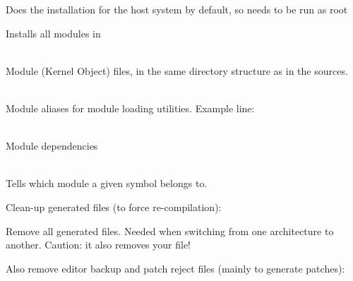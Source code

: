   \startitemize
  \item {}
    \startitemize
    \item Does the installation for the host system by default, so
      needs to be run as root
    \stopitemize
  \item Installs all modules in 
    \startitemize
    \item {}\\
      Module  (Kernel Object) files, in the same directory
      structure as in the sources.
    \item {}\\
      Module aliases for module loading utilities. Example line:\\
    \item {}\\
      Module dependencies
    \item {}\\
      Tells which module a given symbol belongs to.
    \stopitemize
  \stopitemize

    \startitemize
    \item Clean-up generated files (to force re-compilation):\\
    \item Remove all generated files. Needed when switching from one
      architecture to another. Caution: it also removes your  file!\\
    \item Also remove editor backup and patch reject files (mainly to
      generate patches):\\
    \stopitemize

